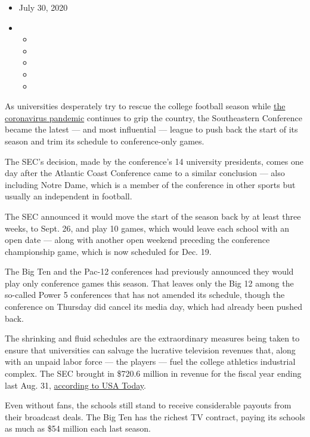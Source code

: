 \begin{itemize}
\item
  July 30, 2020
\item
  \begin{itemize}
  \item
  \item
  \item
  \item
  \item
  \end{itemize}
\end{itemize}

As universities desperately try to rescue the college football season
while \href{https://www.nytimes.com/news-event/coronavirus}{the
coronavirus pandemic} continues to grip the country, the Southeastern
Conference became the latest --- and most influential --- league to push
back the start of its season and trim its schedule to conference-only
games.

The SEC's decision, made by the conference's 14 university presidents,
comes one day after the Atlantic Coast Conference came to a similar
conclusion --- also including Notre Dame, which is a member of the
conference in other sports but usually an independent in football.

The SEC announced it would move the start of the season back by at least
three weeks, to Sept. 26, and play 10 games, which would leave each
school with an open date --- along with another open weekend preceding
the conference championship game, which is now scheduled for Dec. 19.

The Big Ten and the Pac-12 conferences had previously announced they
would play only conference games this season. That leaves only the Big
12 among the so-called Power 5 conferences that has not amended its
schedule, though the conference on Thursday did cancel its media day,
which had already been pushed back.

The shrinking and fluid schedules are the extraordinary measures being
taken to ensure that universities can salvage the lucrative television
revenues that, along with an unpaid labor force --- the players --- fuel
the college athletics industrial complex. The SEC brought in \$720.6
million in revenue for the fiscal year ending last Aug. 31,
\href{https://www.usatoday.com/story/sports/ncaaf/sec/2020/01/30/sec-generated-721-million-revenue-still-trails-big-ten/2856234001/}{according
to USA Today}.

Even without fans, the schools still stand to receive considerable
payouts from their broadcast deals. The Big Ten has the richest TV
contract, paying its schools as much as \$54 million each last season.

